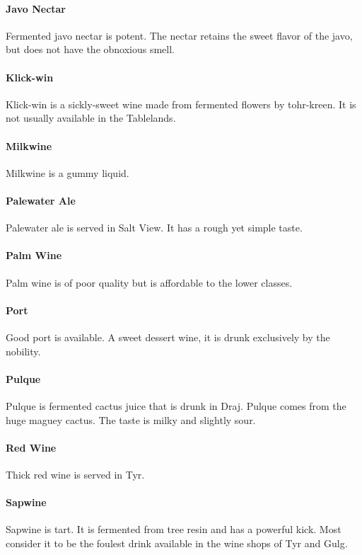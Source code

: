 \begin{multicols}{2}
\paragraph{Javo Nectar} Fermented javo nectar is potent. The nectar retains the sweet flavor of the javo, but does not have the obnoxious smell.\\
\paragraph{Klick-win} Klick-win is a sickly-sweet wine made from fermented flowers by tohr-kreen. It is not usually available in the Tablelands.\\
\paragraph{Milkwine} Milkwine is a gummy liquid.\\
\paragraph{Palewater Ale} Palewater ale is served in Salt View. It has a rough yet simple taste.\\
\paragraph{Palm Wine} Palm wine is of poor quality but is affordable to the lower classes.\\
\paragraph{Port} Good port is available. A sweet dessert wine, it is drunk exclusively by the nobility.\\
\paragraph{Pulque} Pulque is fermented cactus juice that is drunk in Draj. Pulque comes from the huge maguey cactus. The taste is milky and slightly sour.\\
\paragraph{Red Wine} Thick red wine is served in Tyr.\\
\paragraph{Sapwine} Sapwine is tart. It is fermented from tree resin and has a powerful kick. Most consider it to be the foulest drink available in the wine shops of Tyr and Gulg.\\

\end{multicols}
